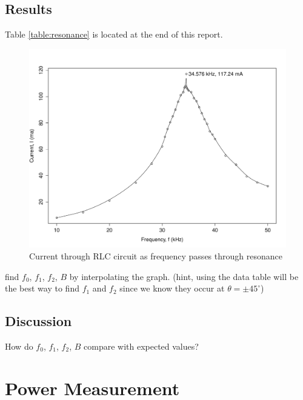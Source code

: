\documentclass[12pt]{article}
\begin{document}
\subsection{Results}\label{sec:res_results}
Table \ref{table:resonance} is located at the end of this report.

\begin{figure}[h]
	\centering
	\includegraphics[scale=0.5]{resonance_plot}
	\caption{Current through RLC circuit as frequency passes through resonance}
	\label{figure:res_graph}
\end{figure}

find $f_0$, $f_1$, $f_2$, $B$ by interpolating the graph. (hint, using the data table will be the best way to find $f_1$ and $f_2$ since we know they occur at $\theta = \pm45^{\circ}$)

\subsection{Discussion}\label{sec:res_discussion}
How do $f_0$, $f_1$, $f_2$, $B$ compare with expected values?

\section{Power Measurement}\label{sec:power}
\end{document}
